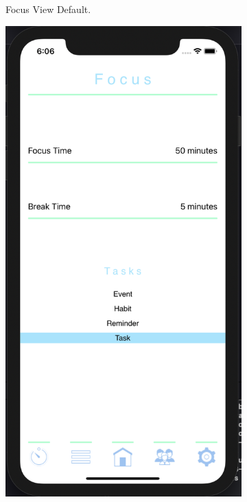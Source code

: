 \begin{figure}[H]
\begin{subfigure}[b]{0.3\textwidth}
        \caption{Focus View Default.}
        \label{fig:focus_default_app}
    \end{subfigure}
    \hfill
    \begin{subfigure}[b]{0.3\textwidth}
        \centering
        \includegraphics[width=\textwidth]{./graphics/Implementation/Focus/focus settings.png}

\end{subfigure}
\end{figure}
